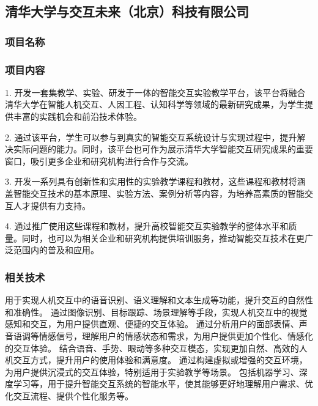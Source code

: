 
\subsection{清华大学与交互未来（北京）科技有限公司}


\subsubsection{项目名称}


\subsubsection{项目内容}

1. 开发一套集教学、实验、研发于一体的智能交互实验教学平台，该平台将融合清华大学在智能人机交互、人因工程、认知科学等领域的最新研究成果，为学生提供丰富的实践机会和前沿技术体验。

2. 通过该平台，学生可以参与到真实的智能交互系统设计与实现过程中，提升解决实际问题的能力。同时，该平台也可作为展示清华大学智能交互研究成果的重要窗口，吸引更多企业和研究机构进行合作与交流。

3. 开发一系列具有创新性和实用性的实验教学课程和教材，这些课程和教材将涵盖智能交互技术的基本原理、实验方法、案例分析等内容，为培养高素质的智能交互人才提供有力支持。

4. 通过推广使用这些课程和教材，提升高校智能交互实验教学的整体水平和质量。同时，也可以为相关企业和研究机构提供培训服务，推动智能交互技术在更广泛范围内的普及和应用。

\subsubsection{相关技术}

用于实现人机交互中的语音识别、语义理解和文本生成等功能，提升交互的自然性和准确性。
通过图像识别、目标跟踪、场景理解等手段，实现人机交互中的视觉感知和交互，为用户提供直观、便捷的交互体验。
通过分析用户的面部表情、声音语调等情感信号，理解用户的情感状态和需求，为用户提供更加个性化、情感化的交互体验。
结合语音、手势、眼动等多种交互模态，实现更加自然、高效的人机交互方式，提升用户的使用体验和满意度。
通过构建虚拟或增强的交互环境，为用户提供沉浸式的交互体验，特别适用于实验教学等场景。
包括机器学习、深度学习等，用于提升智能交互系统的智能水平，使其能够更好地理解用户需求、优化交互流程、提供个性化服务等。


